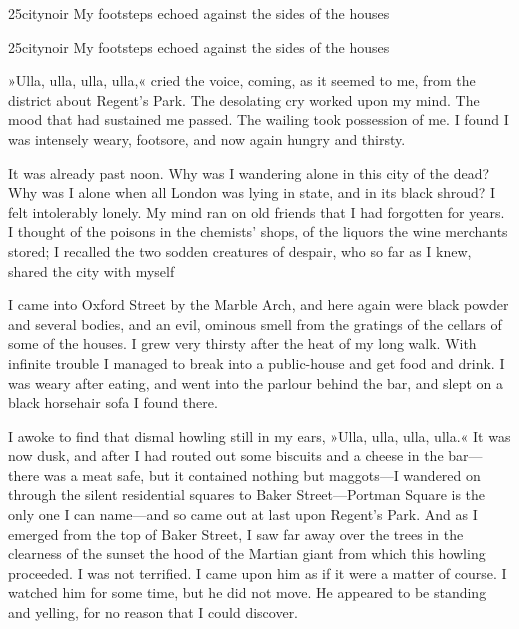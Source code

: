 

\begin{letter}
	\begin{bwbigpic}
		[1.2] 
		{25citynoir} 
		{My footsteps echoed against the sides of the houses} 
	\end{bwbigpic}

\end{letter}

\begin{a4}
	\begin{bwbigpic}
		[1.1] 
		{25citynoir} 
		{My footsteps echoed against the sides of the houses} 
	\end{bwbigpic}
\end{a4}

»Ulla, ulla, ulla, ulla,« cried the voice, coming, as it seemed to me, from the district about Regent's Park. The desolating cry worked upon my mind. The mood that had sustained me passed. The wailing took possession of me. I found I was intensely weary, footsore, and now again hungry and thirsty.

It was already past noon. Why was I wandering alone in this city of the dead? Why was I alone when all London was lying in state, and in its black shroud? I felt intolerably lonely. My mind ran on old friends that I had forgotten for years. I thought of the poisons in the chemists' shops, of the liquors the wine merchants stored; I recalled the two sodden creatures of despair, who so far as I knew, shared the city with myself\textellipsis

I came into Oxford Street by the Marble Arch, and here again were black powder and several bodies, and an evil, ominous smell from the gratings of the cellars of some of the houses. I grew very thirsty after the heat of my long walk. With infinite trouble I managed to break into a public-house and get food and drink. I was weary after eating, and went into the parlour behind the bar, and slept on a black horsehair sofa I found there.

I awoke to find that dismal howling still in my ears, »Ulla, ulla, ulla, ulla.« It was now dusk, and after I had routed out some biscuits and a cheese in the bar—there was a meat safe, but it contained nothing but maggots—I wandered on through the silent residential squares to Baker Street—Portman Square is the only one I can name—and so came out at last upon Regent's Park. And as I emerged from the top of Baker Street, I saw far away over the trees in the clearness of the sunset the hood of the Martian giant from which this howling proceeded. I was not terrified. I came upon him as if it were a matter of course. I watched him for some time, but he did not move. He appeared to be standing and yelling, for no reason that I could discover.

